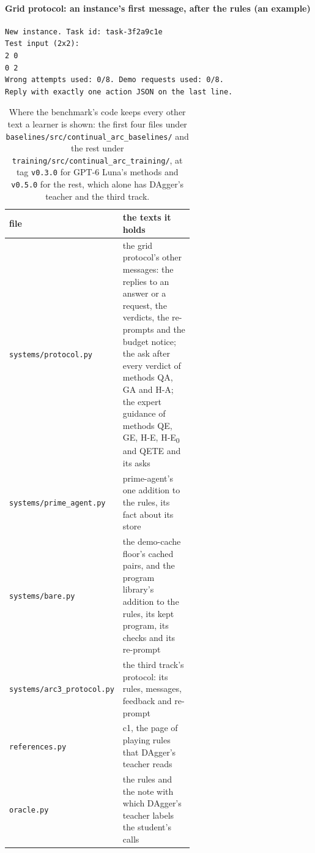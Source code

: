 \paragraph{Grid protocol: an instance's first message, after the rules (an example)}
\begin{scriptsize}\begin{verbatim}
New instance. Task id: task-3f2a9c1e
Test input (2x2):
2 0
0 2
Wrong attempts used: 0/8. Demo requests used: 0/8.
Reply with exactly one action JSON on the last line.
\end{verbatim}\end{scriptsize}

\begin{table}[htbp]
\centering
\footnotesize
\begin{tabular}{@{}lp{0.6\linewidth}@{}}
\toprule
file & the texts it holds \\
\midrule
\texttt{systems/protocol.py} & the grid protocol's other messages: the replies to an answer or a request, the verdicts, the re-prompts and the budget notice; the ask after every verdict of methods QA, GA and \mbox{H-A}; the expert guidance of methods QE, GE, \mbox{H-E}, \mbox{H-E\textsubscript{0}} and QETE and its asks \\
\texttt{systems/prime\_agent.py} & prime-agent's one addition to the rules, its fact about its store \\
\texttt{systems/bare.py} & the demo-cache floor's cached pairs, and the program library's addition to the rules, its kept program, its checks and its re-prompt \\
\texttt{systems/arc3\_protocol.py} & the third track's protocol: its rules, messages, feedback and re-prompt \\
\texttt{references.py} & c1, the page of playing rules that DAgger's teacher reads \\
\texttt{oracle.py} & the rules and the note with which DAgger's teacher labels the student's calls \\
\bottomrule
\end{tabular}
\caption{Where the benchmark's code keeps every other text a learner is shown: the first four files under \texttt{baselines/src/continual\_arc\_baselines/} and the rest under \texttt{training/src/continual\_arc\_training/}, at tag \texttt{v0.3.0} for GPT-6 Luna's methods and \texttt{v0.5.0} for the rest, which alone has DAgger's teacher and the third track.}
\label{tab:prompts}
\end{table}
